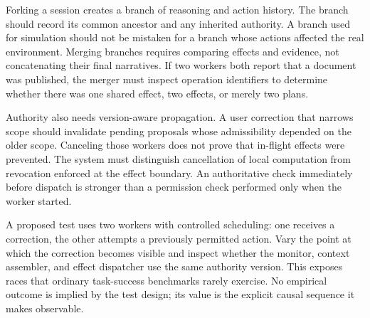 Forking a session creates a branch of reasoning and action history. The branch should record its common ancestor and any inherited authority. A branch used for simulation should not be mistaken for a branch whose actions affected the real environment. Merging branches requires comparing effects and evidence, not concatenating their final narratives. If two workers both report that a document was published, the merger must inspect operation identifiers to determine whether there was one shared effect, two effects, or merely two plans.

Authority also needs version-aware propagation. A user correction that narrows scope should invalidate pending proposals whose admissibility depended on the older scope. Canceling those workers does not prove that in-flight effects were prevented. The system must distinguish cancellation of local computation from revocation enforced at the effect boundary. An authoritative check immediately before dispatch is stronger than a permission check performed only when the worker started.

A proposed test uses two workers with controlled scheduling: one receives a correction, the other attempts a previously permitted action. Vary the point at which the correction becomes visible and inspect whether the monitor, context assembler, and effect dispatcher use the same authority version. This exposes races that ordinary task-success benchmarks rarely exercise. No empirical outcome is implied by the test design; its value is the explicit causal sequence it makes observable.

